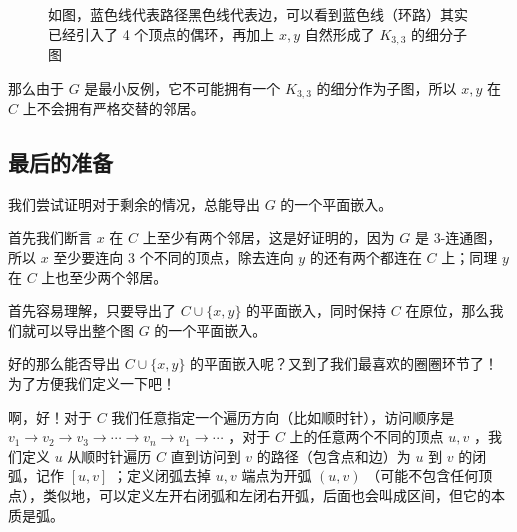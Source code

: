 \documentclass[11pt, a4paper]{ctexart}
\begin{document}
\begin{figure}[H]
    \caption{如图，蓝色线代表路径黑色线代表边，可以看到蓝色线（环路）其实已经引入了 4 个顶点的偶环，再加上 $x,y$ 自然形成了 $K_{3,3}$ 的细分子图}
\end{figure}

那么由于 $G$ 是最小反例，它不可能拥有一个 $K_{3,3}$ 的细分作为子图，所以 $x,y$ 在 $C$ 上不会拥有严格交替的邻居。

\subsection{最后的准备}
我们尝试证明对于剩余的情况，总能导出 $G$ 的一个平面嵌入。

首先我们断言 $x$ 在 $C$ 上至少有两个邻居，这是好证明的，因为 $G$ 是 3-连通图，所以 $x$ 至少要连向 3 个不同的顶点，除去连向 $y$ 的还有两个都连在 $C$ 上；同理 $y$ 在 $C$ 上也至少两个邻居。

首先容易理解，只要导出了 $C\cup\{x,y\}$ 的平面嵌入，同时保持 $C$ 在原位，那么我们就可以导出整个图 $G$ 的一个平面嵌入。

好的那么能否导出 $C\cup\{x,y\}$ 的平面嵌入呢？又到了我们最喜欢的圈圈环节了！为了方便我们定义一下吧！

啊，好！对于 $C$ 我们任意指定一个遍历方向（比如顺时针），访问顺序是 $v_1\to v_2\to v_3\to \cdots\to v_n\to v_1\to \cdots$ ，对于 $C$ 上的任意两个不同的顶点 $u,v$ ，我们定义 $u$ 从顺时针遍历 $C$ 直到访问到 $v$ 的路径（包含点和边）为 $u$ 到 $v$ 的闭弧，记作 $[u,v]$ ；定义闭弧去掉 $u,v$ 端点为开弧 $(u,v)$ （可能不包含任何顶点），类似地，可以定义左开右闭弧和左闭右开弧，后面也会叫成区间，但它的本质是弧。
\end{document}
